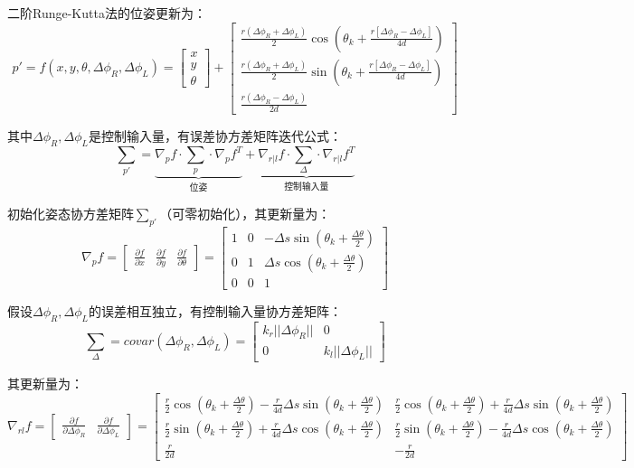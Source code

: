 \documentclass[
12pt, %
a4paper, 
oneside, %
headinclude,footinclude, %
]{scrartcl}
\begin{document}
二阶Runge-Kutta法的位姿更新为：
$$
p' = f(x, y, \theta, \Delta\phi_R, \Delta\phi_L) = 
\begin{bmatrix} x \\ y \\ \theta \end{bmatrix} + 
\begin{bmatrix} \frac{r(\Delta\phi_R + \Delta\phi_L)}{2} \cos(\theta_k + \frac{r[\Delta\phi_R - \Delta\phi_L]}{4d}) \\ \frac{r(\Delta\phi_R + \Delta\phi_L)}{2} \sin(\theta_k + \frac{r[\Delta\phi_R - \Delta\phi_L]}{4d}) \\ \frac{r(\Delta\phi_R - \Delta\phi_L)}{2d} \end{bmatrix}
$$

其中$ \Delta\phi_R,\Delta\phi_L $是控制输入量，有误差协方差矩阵迭代公式：
$$ \sum_{p'} = \underbrace{\nabla_p f \cdot \sum_p \cdot \nabla_p f^T}_{\text{位姿}} + \underbrace{\nabla_{r|l}f \cdot \sum_{\Delta} \cdot \nabla_{r|l}f^T}_{\text{控制输入量}} $$

初始化姿态协方差矩阵$ \sum_{p'} $（可零初始化），其更新量为：
$$
\nabla_p f = \begin{bmatrix}\frac{\partial f}{\partial x} & \frac{\partial f}{\partial y} & \frac{\partial f}{\partial \theta}\end{bmatrix} = 
\begin{bmatrix} 1 & 0 & -\Delta s \sin(\theta_k + \frac{\Delta\theta}{2}) \\ 0 & 1 & \Delta s \cos(\theta_k + \frac{\Delta\theta}{2}) \\ 0 & 0 & 1 \end{bmatrix}
$$

假设$ \Delta\phi_R,\Delta\phi_L $的误差相互独立，有控制输入量协方差矩阵：
$$ \sum_{\Delta} = covar(\Delta\phi_R, \Delta\phi_L) = \begin{bmatrix} k_r||\Delta\phi_R|| & 0 \\ 0 & k_l||\Delta\phi_L|| \end{bmatrix} $$

其更新量为：
$$ \nabla_{rl}f = \begin{bmatrix} \frac{\partial f}{\partial \Delta\phi_R} & \frac{\partial f}{\partial \Delta\phi_L} \end{bmatrix} = \begin{bmatrix} \frac{r}{2}\cos(\theta_k + \frac{\Delta\theta}{2}) - \frac{r}{4d}\Delta s \sin(\theta_k + \frac{\Delta\theta}{2}) & \frac{r}{2}\cos(\theta_k + \frac{\Delta\theta}{2}) + \frac{r}{4d}\Delta s \sin(\theta_k + \frac{\Delta\theta}{2}) \\ \frac{r}{2}\sin(\theta_k + \frac{\Delta\theta}{2}) + \frac{r}{4d}\Delta s \cos(\theta_k + \frac{\Delta\theta}{2}) & \frac{r}{2}\sin(\theta_k + \frac{\Delta\theta}{2}) - \frac{r}{4d}\Delta s \cos(\theta_k + \frac{\Delta\theta}{2}) \\ \frac{r}{2d} & -\frac{r}{2d} \end{bmatrix} $$
\end{document}
